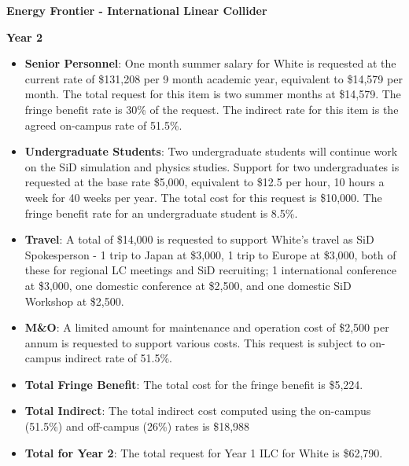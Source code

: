 \textbf{Energy Frontier - International Linear Collider}

\item{\bf Year 2}

\begin{itemize}

\item{{\bf Senior Personnel}: One month summer salary for White is requested at the current rate of \$131,208 per 9 month academic year, 
equivalent to \$14,579 per month.  The total request for this item is two summer months at \$14,579. The fringe benefit rate is 30\% of the request.  
The indirect rate for this item is the agreed on-campus rate of 51.5\%.}

\item {{\bf Undergraduate Students}: Two undergraduate students will continue work on the SiD simulation and physics studies.
Support for two undergraduates is requested at the base rate \$5,000, equivalent to \$12.5 per hour, 10 hours a week for 40 weeks per year.  
The total cost for this request is \$10,000.  The fringe benefit rate for an undergraduate student is 8.5\%.}

\item{{\bf Travel}: A total of \$14,000 is requested to support White's travel as SiD Spokesperson - 1 trip to Japan at \$3,000, 1 trip to
Europe at \$3,000, both of these for regional LC meetings and SiD recruiting; 1 international conference at \$3,000, one domestic conference 
at \$2,500, and one domestic SiD Workshop at \$2,500.}

\item {{\bf M\&O}: A limited amount for maintenance and operation cost of \$2,500 per annum is requested to support various costs.   
This request is subject to on-campus indirect rate of 51.5\%.}

\item {{\bf Total Fringe Benefit}: The total cost for the fringe benefit is \$5,224.}

\item {{\bf Total Indirect}: The total indirect cost computed using the on-campus (51.5\%) and off-campus (26\%) rates is \$18,988}

\item {{\bf Total for Year 2}: The total request for Year 1 ILC for White is \$62,790.}

\end{itemize}